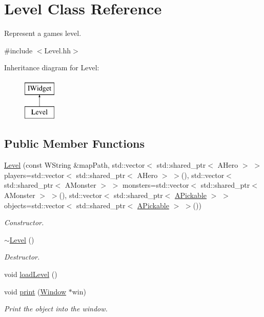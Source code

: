 \hypertarget{classLevel}{}\section{Level Class Reference}
\label{classLevel}


Represent a game\textquotesingle{}s level.  




{\ttfamily \#include $<$Level.\+hh$>$}

Inheritance diagram for Level\+:\begin{figure}[H]
\begin{center}
\leavevmode
\includegraphics[height=2.000000cm]{classLevel}
\end{center}
\end{figure}
\subsection*{Public Member Functions}
\begin{DoxyCompactItemize}
\item 
\hyperlink{classLevel_a1cddef79da66a80002686199a847543f}{Level} (const W\+String \&map\+Path, std\+::vector$<$ std\+::shared\+\_\+ptr$<$ A\+Hero $>$ $>$ players=std\+::vector$<$ std\+::shared\+\_\+ptr$<$ A\+Hero $>$ $>$(), std\+::vector$<$ std\+::shared\+\_\+ptr$<$ A\+Monster $>$ $>$ monsters=std\+::vector$<$ std\+::shared\+\_\+ptr$<$ A\+Monster $>$ $>$(), std\+::vector$<$ std\+::shared\+\_\+ptr$<$ \hyperlink{classAPickable}{A\+Pickable} $>$ $>$ objects=std\+::vector$<$ std\+::shared\+\_\+ptr$<$ \hyperlink{classAPickable}{A\+Pickable} $>$ $>$())
\begin{DoxyCompactList}\small\item\em Constructor. \end{DoxyCompactList}\item 
\hyperlink{classLevel_a249eac1e8f19ff44134efa5e986feaca}{$\sim$\+Level} ()
\begin{DoxyCompactList}\small\item\em Destructor. \end{DoxyCompactList}\item 
void \hyperlink{classLevel_aa88db36cd824320cb599d913603dc2a3}{load\+Level} ()
\item 
void \hyperlink{classLevel_ab8311fe64b7957d627053359331b0b6b}{print} (\hyperlink{classWindow}{Window} $\ast$win)
\begin{DoxyCompactList}\small\item\em Print the object into the window. \end{DoxyCompactList}\end{DoxyCompactItemize}



